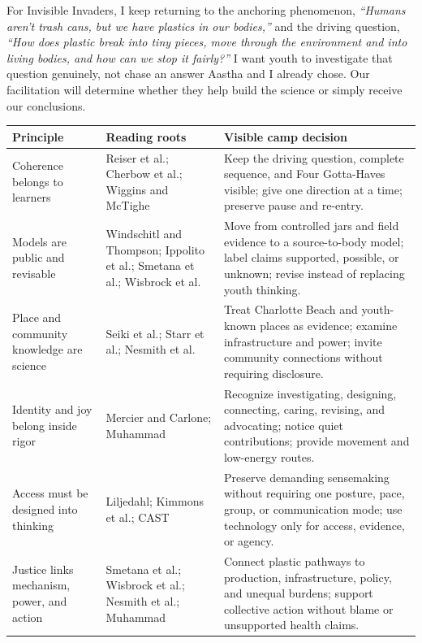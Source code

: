 \documentclass[11pt,letterpaper]{article}
\newcommand{\reviewsection}[1]{\Needspace{5\baselineskip}\vspace{0.07in}\noindent{\normalsize\bfseries\color{PrimaryRed}#1}\par\vspace{0.02in}}
\begin{document}
For Invisible Invaders, I keep returning to the anchoring phenomenon, \emph{``Humans aren't trash cans, but we have plastics in our bodies,''} and the driving question, \emph{``How does plastic break into tiny pieces, move through the environment and into living bodies, and how can we stop it fairly?''} I want youth to investigate that question genuinely, not chase an answer Aastha and I already chose. Our facilitation will determine whether they help build the science or simply receive our conclusions.

\reviewsection{Principles at a Glance}

\small
\renewcommand{\arraystretch}{1.2}
\setlength{\tabcolsep}{5pt}
\begin{tabular}{>{\RaggedRight\arraybackslash}p{1.08in} >{\RaggedRight\arraybackslash}p{2.05in} >{\RaggedRight\arraybackslash}p{3.72in}}
\toprule
\rowcolor{SoftBlue}
\textbf{Principle} & \textbf{Reading roots} & \textbf{Visible camp decision} \\
\midrule
Coherence belongs to learners & Reiser et al.; Cherbow et al.; Wiggins and McTighe & Keep the driving question, complete sequence, and Four Gotta-Haves visible; give one direction at a time; preserve pause and re-entry. \\
Models are public and revisable & Windschitl and Thompson; Ippolito et al.; Smetana et al.; Wisbrock et al. & Move from controlled jars and field evidence to a source-to-body model; label claims supported, possible, or unknown; revise instead of replacing youth thinking. \\
Place and community knowledge are science & Seiki et al.; Starr et al.; Nesmith et al. & Treat Charlotte Beach and youth-known places as evidence; examine infrastructure and power; invite community connections without requiring disclosure. \\
Identity and joy belong inside rigor & Mercier and Carlone; Muhammad & Recognize investigating, designing, connecting, caring, revising, and advocating; notice quiet contributions; provide movement and low-energy routes. \\
Access must be designed into thinking & Liljedahl; Kimmons et al.; CAST & Preserve demanding sensemaking without requiring one posture, pace, group, or communication mode; use technology only for access, evidence, or agency. \\
Justice links mechanism, power, and action & Smetana et al.; Wisbrock et al.; Nesmith et al.; Muhammad & Connect plastic pathways to production, infrastructure, policy, and unequal burdens; support collective action without blame or unsupported health claims. \\
\bottomrule
\end{tabular}
\normalsize
\end{document}
